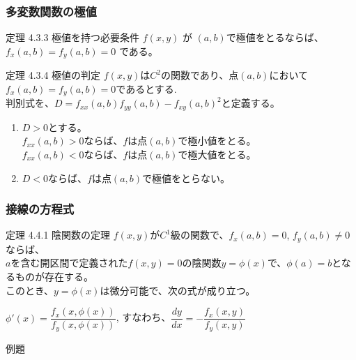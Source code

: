 \documentclass[a4paper]{jsarticle}
\begin{document}
\subsubsection{多変数関数の極値}
\begin{itembox}[l]{定理 4.3.3 極値を持つ必要条件}
    $f\left(x,y\right)$ が $\left(a,b\right)$で極値をとるならば、
    $f_x\left(a,b\right)=f_y\left(a,b\right)=0$ である。
\end{itembox}
\begin{itembox}[l]{定理 4.3.4 極値の判定}
    $f\left(x,y\right)$は$C^2$の関数であり、点$\left(a,b\right)$において
    $f_x\left(a,b\right)=f_y\left(a, b\right)=0$であるとする.\\
    判別式を、$D=f_{xx}\left(a,b\right)f_{yy}\left(a,b\right)-f_{xy}(a,b)^2$と定義する。
    \begin{enumerate}
        \item $D>0$とする。\\
              $f_{xx}\left(a,b\right)>0$ならば、$f$は点$\left(a,b\right)$で極小値をとる。\\
              $f_{xx}\left(a,b\right)<0$ならば、$f$は点$\left(a,b\right)$で極大値をとる。
        \item $D<0$ならば、$f$は点$\left(a,b\right)$で極値をとらない。
    \end{enumerate}
\end{itembox}

\subsubsection{接線の方程式}
\begin{itembox}[l]{定理 4.4.1 陰関数の定理}
    $f\left(x,y\right)$が$C^1$級の関数で、$f_x\left(a,b\right)=0$, $f_y\left(a,b\right)\neq0$ならば、\\
    $a$を含む開区間で定義された$f(x,y)=0$の陰関数$y=\phi\left(x\right)$で、$\phi\left(a\right)=b$となるものが存在する。\\
    このとき、$y=\phi\left(x\right)$は微分可能で、次の式が成り立つ。
    \begin{center}
        $\phi'\left(x\right)=\dfrac{f_x\left(x,\phi\left(x\right)\right)}{f_y\left(x,\phi\left(x\right)\right)}$,
        すなわち、$\dfrac{dy}{dx}=-\dfrac{f_x\left(x,y\right)}{f_y\left(x,y\right)}$
    \end{center}
\end{itembox}
\begin{itembox}[l]{例題 }

\end{itembox}
\end{document}
